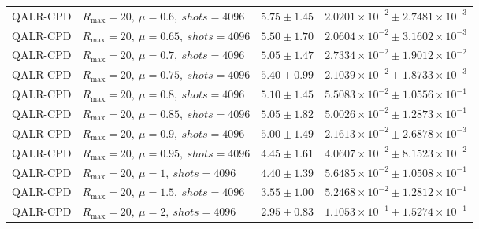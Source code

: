 \begin{table}[t]
\begin{tabular}{@{}llcc@{}}
QALR-CPD & \(R_{\max}=20,\ \mu=0.6,\ shots=4096\) & \(5.75 \pm 1.45\) & \(2.0201{\times}10^{-2} \pm 2.7481{\times}10^{-3}\) \\
QALR-CPD & \(R_{\max}=20,\ \mu=0.65,\ shots=4096\) & \(5.50 \pm 1.70\) & \(2.0604{\times}10^{-2} \pm 3.1602{\times}10^{-3}\) \\
QALR-CPD & \(R_{\max}=20,\ \mu=0.7,\ shots=4096\) & \(5.05 \pm 1.47\) & \(2.7334{\times}10^{-2} \pm 1.9012{\times}10^{-2}\) \\
QALR-CPD & \(R_{\max}=20,\ \mu=0.75,\ shots=4096\) & \(5.40 \pm 0.99\) & \(2.1039{\times}10^{-2} \pm 1.8733{\times}10^{-3}\) \\
QALR-CPD & \(R_{\max}=20,\ \mu=0.8,\ shots=4096\) & \(5.10 \pm 1.45\) & \(5.5083{\times}10^{-2} \pm 1.0556{\times}10^{-1}\) \\
QALR-CPD & \(R_{\max}=20,\ \mu=0.85,\ shots=4096\) & \(5.05 \pm 1.82\) & \(5.0026{\times}10^{-2} \pm 1.2873{\times}10^{-1}\) \\
QALR-CPD & \(R_{\max}=20,\ \mu=0.9,\ shots=4096\) & \(5.00 \pm 1.49\) & \(2.1613{\times}10^{-2} \pm 2.6878{\times}10^{-3}\) \\
QALR-CPD & \(R_{\max}=20,\ \mu=0.95,\ shots=4096\) & \(4.45 \pm 1.61\) & \(4.0607{\times}10^{-2} \pm 8.1523{\times}10^{-2}\) \\
QALR-CPD & \(R_{\max}=20,\ \mu=1,\ shots=4096\) & \(4.40 \pm 1.39\) & \(5.6485{\times}10^{-2} \pm 1.0508{\times}10^{-1}\) \\
QALR-CPD & \(R_{\max}=20,\ \mu=1.5,\ shots=4096\) & \(3.55 \pm 1.00\) & \(5.2468{\times}10^{-2} \pm 1.2812{\times}10^{-1}\) \\
QALR-CPD & \(R_{\max}=20,\ \mu=2,\ shots=4096\) & \(2.95 \pm 0.83\) & \(1.1053{\times}10^{-1} \pm 1.5274{\times}10^{-1}\) \\
\bottomrule
\end{tabular}
\end{table}